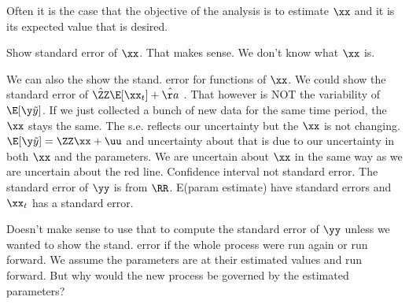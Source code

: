 Often it is the case that the objective of the analysis is to estimate $\xx$ and it is its expected value that is desired.  

Show standard error of $\xx$.  That makes sense.  We don't know what $\xx$ is.

We can also the show the stand. error for functions of $\xx$.  We could show the standard error of $\hat{\ZZ}\E[\xx_t] + \hat{\aa}$ .  That however is NOT the variability of $\E[\y\tilde{y}]$.  If we just collected a bunch of new data for the same time period, the $\xx$ stays the same.  The s.e. reflects our uncertainty but the $\xx$ is not changing.  $\E[\y\tilde{y}]=\ZZ\xx+\uu$ and uncertainty about that is due to our uncertainty in both $\xx$ and the parameters.  We are uncertain about $\xx$ in the same way as we are uncertain about the red line.  Confidence interval not standard error.  The standard error of $\yy$ is from $\RR$.  E(param estimate) have standard errors and $\xx_t$ has a standard error.

Doesn't make sense to use that to compute the standard error of $\yy$ unless we wanted to show the stand. error if the whole process were run again or run forward.  We assume the parameters are at their estimated values and run forward. But why would the new process be governed by the estimated parameters?

